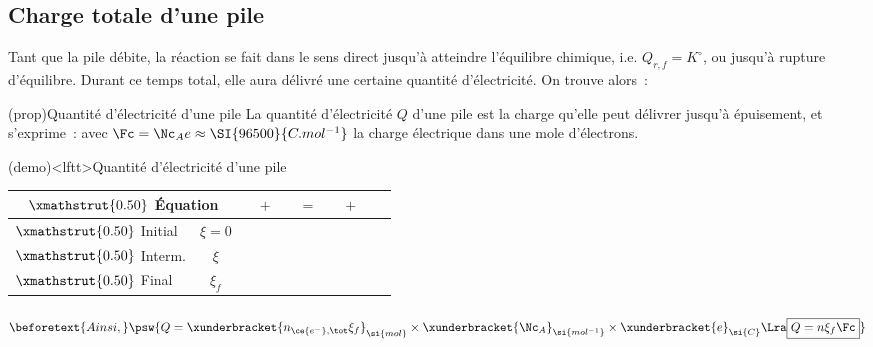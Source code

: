 \documentclass[../../main/main.tex]{subfiles}
\begin{document}
\subsection{Charge totale d'une pile}

Tant que la pile débite, la réaction se fait dans le sens direct jusqu'à
atteindre l'équilibre chimique, i.e. $Q_{r,f} = K^\circ$, ou jusqu'à rupture
d'équilibre. Durant ce temps total, elle aura délivré une certaine quantité
d'électricité. On trouve alors~:
\begin{tcb*}(prop){Quantité d'électricité d'une pile}
	La quantité d'électricité $Q$ d'une pile est la charge qu'elle peut délivrer
	jusqu'à épuisement, et s'exprime~:
	\psw{
		\[
			\boxed{Q = n \xi\ind{eq}\Fc}
		\]
	}%
	avec $\Fc = \Nc_A e \approx \SI{96500}{C.mol^{-1}}$ la charge électrique dans
	une mole d'électrons.
\end{tcb*}

\begin{tcb*}(demo)<lftt>{Quantité d'électricité d'une pile}
	\begin{center}
		\def\rhgt{0.50}
		\centering
		\begin{tabularx}{\linewidth}{|l|c||YdYdYdY||Y|}
			\hline
			\multicolumn{2}{|c||}{
				$\xmathstrut{\rhgt}$
			\textbf{Équation}}   &
			   & $+$       &
			  & $=$       &
			  & $+$       &
			   &
			                   \\
			\hline
			$\xmathstrut{\rhgt}$
			Initial              & $\xi = 0$ &
			          & \vline    &
			          & \vline    &
			          & \vline    &
			          &
			\\
			\hline
			$\xmathstrut{\rhgt}$
			Interm.              & $\xi$     &
			   & \vline    &
			   & \vline    &
			   & \vline    &
			   &
			       \\
			\hline
			$\xmathstrut{\rhgt}$
			Final                & $\xi_f$   &
			 & \vline    &
			 & \vline    &
			 & \vline    &
			 &
			   \\
			\hline
		\end{tabularx}
	\end{center}
	\vspace{-15pt}
	\begin{gather*}
		\beforetext{Ainsi,}
		\psw{
		Q =
		\xunderbracket{n_{\ce{e^-},\tot} \xi_f}_{\si{mol}}
		\times
		\xunderbracket{\Nc_A}_{\si{mol^{-1}}}
		\times
		\xunderbracket{e}_{\si{C}}
		\Lra
		\boxed{Q = n \xi_f \Fc}
		}
		\vspace{-15pt}
	\end{gather*}
\end{tcb*}
\end{document}

